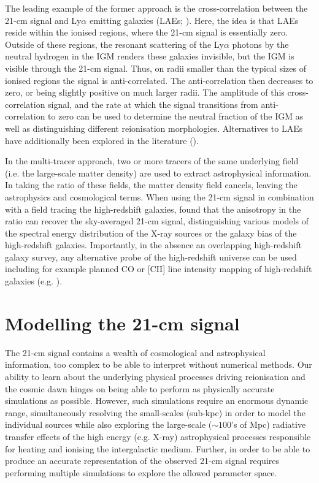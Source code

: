 The leading example of the former approach is the cross-correlation between the 21-cm signal and Ly$\alpha$ emitting galaxies (LAEs; \cite{Wyithe:2007,Wiersma:2013,Sobacchi:2016,Vrbanec:2016,Heneka:2017,Hutter:2017,Hutter:2018a,Kubota:2018}). Here, the idea is that LAEs reside within the ionised regions, where the 21-cm signal is essentially zero. Outside of these regions, the resonant scattering of the Ly$\alpha$ photons by the neutral hydrogen in the IGM renders these galaxies invisible, but the IGM is visible through the 21-cm signal. Thus, on radii smaller than the typical sizes of ionised regions the signal is anti-correlated. The anti-correlation then decreases to zero, or being slightly positive on much larger radii. The amplitude of this cross-correlation signal, and the rate at which the signal transitions from anti-correlation to zero can be used to determine the neutral fraction of the IGM as well as distinguishing different reionisation morphologies. Alternatives to LAEs have additionally been explored in the literature (\cite{Furlanetto:2007,Lidz:2009,Park:2014,Beardsley:2015}).

In the multi-tracer approach, two or more tracers of the same underlying field (i.e. the large-scale matter density) are used to extract astrophysical information. In taking the ratio of these fields, the matter density field cancels, leaving the astrophysics and cosmological terms. When using the 21-cm signal in combination with a field tracing the high-redshift galaxies, \cite{Fialkov:2019a} found that the anisotropy in the ratio can recover the sky-averaged 21-cm signal, distinguishing various models of the spectral energy distribution of the X-ray sources or the galaxy bias of the high-redshift galaxies. Importantly, in the absence an overlapping high-redshift galaxy survey, any alternative probe of the high-redshift universe can be used including for example planned CO or [CII] line intensity mapping of high-redshift galaxies (e.g. \cite{}).

\section{Modelling the 21-cm signal} \label{sec:models}

The 21-cm signal contains a wealth of cosmological and astrophysical information, too complex to be able to interpret without numerical methods. Our ability to learn about the underlying physical processes driving reionisation and the cosmic dawn hinges on being able to perform as physically accurate simulations as possible. However, such simulations require an enormous dynamic range, simultaneously resolving the small-scales (sub-kpc) in order to model the individual sources while also exploring the large-scale ($\sim100$'s of Mpc) radiative transfer effects of the high energy (e.g. X-ray) astrophysical processes responsible for heating and ionising the intergalactic medium. Further, in order to be able to produce an accurate representation of the observed 21-cm signal requires performing multiple simulations to explore the allowed parameter space.

